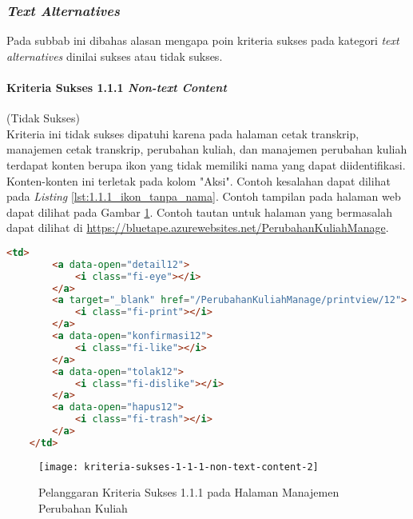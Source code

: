 \subsubsection{\textit{Text Alternatives}}
\label{subsubsec:kepatuhan_bluetape_text_alternatives}
Pada subbab ini dibahas alasan mengapa poin kriteria sukses pada kategori \textit{text alternatives} dinilai sukses atau tidak sukses.

\paragraph{Kriteria Sukses 1.1.1 \textit{Non-text Content}}
\label{par:kepatuhan_bluetape_kriteria_sukses_1.1.1}
(Tidak Sukses)\\

Kriteria ini tidak sukses dipatuhi karena pada halaman cetak transkrip, manajemen cetak transkrip, perubahan kuliah, dan manajemen perubahan kuliah terdapat konten berupa ikon yang tidak memiliki nama yang dapat diidentifikasi. Konten-konten ini terletak pada kolom "Aksi". Contoh kesalahan dapat dilihat pada \textit{Listing} \ref{lst:1.1.1_ikon_tanpa_nama}. Contoh tampilan pada halaman web dapat dilihat pada Gambar \ref{fig:1.1.1_non_text_content_2}. Contoh tautan untuk halaman yang bermasalah dapat dilihat di \url{https://bluetape.azurewebsites.net/PerubahanKuliahManage}.
\begin{lstlisting}[frame=single, label={lst:1.1.1_ikon_tanpa_nama}, language=HTML, caption=Pelanggaran Kriteria Sukses 1.1.1 pada Halaman Manajemen Perubahan Kuliah]
    <td>
        <a data-open="detail12">
            <i class="fi-eye"></i>
        </a>
        <a target="_blank" href="/PerubahanKuliahManage/printview/12">
            <i class="fi-print"></i>
        </a>
        <a data-open="konfirmasi12">
            <i class="fi-like"></i>
        </a>  
        <a data-open="tolak12">
            <i class="fi-dislike"></i>
        </a>
        <a data-open="hapus12">
            <i class="fi-trash"></i>
        </a>
    </td>
\end{lstlisting}

\begin{figure}[H]
    \centering  
    \texttt{[image: kriteria-sukses-1-1-1-non-text-content-2]}  
    \caption[Pelanggaran Kriteria Sukses 1.1.1 pada Halaman Manajemen Perubahan Kuliah]{Pelanggaran Kriteria Sukses 1.1.1 pada Halaman Manajemen Perubahan Kuliah}
    \label{fig:1.1.1_non_text_content_2}  
\end{figure} 

